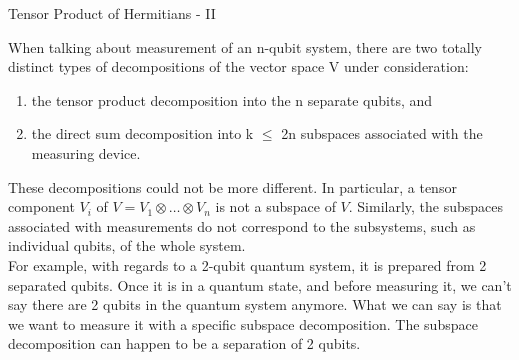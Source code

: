 \documentclass{beamer}
\begin{document}
\begin{frame}{Tensor Product of Hermitians - II}
  {\tiny
    When talking about measurement of an n-qubit system, there are two totally distinct types of
    decompositions of the vector space V under consideration:\\
    \begin{enumerate}[I]
      \item the tensor product decomposition into the n separate qubits, and
      \item the direct sum decomposition into k $\leq$ 2n subspaces associated with the measuring device. 
    \end{enumerate}
    These decompositions could not be more different.
    In particular, a tensor component $V_i$ of $V = V_1 \otimes \dots \otimes V_n$ is not a subspace of $V$.
    Similarly, the subspaces associated with measurements do not correspond to the subsystems,
    such as individual qubits, of the whole system.\\
    \vspace{0.2cm}
    For example, with regards to a 2-qubit quantum system, it is prepared from 2 separated qubits. 
    Once it is in a quantum state, and before measuring it, we can't say there are 2 qubits in the quantum system anymore.
    What we can say is that we want to measure it with a specific subspace decomposition.
    The subspace decomposition can happen to be a separation of 2 qubits.
  }%
\end{frame}
\end{document}
